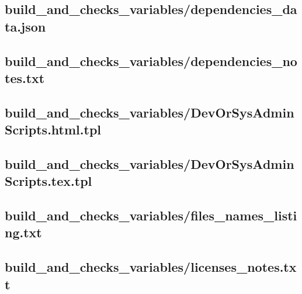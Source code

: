 \documentclass{article}
\begin{document}


\subsection{
  build\_and\_checks\_variables/dependencies\_data.json
}
\label{
  build_and_checks_variables:dependencies_datajson
}



\subsection{
  build\_and\_checks\_variables/dependencies\_notes.txt
}
\label{
  build_and_checks_variables:dependencies_notestxt
}



\subsection{
  build\_and\_checks\_variables/DevOrSysAdminScripts.html.tpl
}
\label{
  build_and_checks_variables:DevOrSysAdminScriptshtmltpl
}



\subsection{
  build\_and\_checks\_variables/DevOrSysAdminScripts.tex.tpl
}
\label{
  build_and_checks_variables:DevOrSysAdminScriptstextpl
}



\subsection{
  build\_and\_checks\_variables/files\_names\_listing.txt
}
\label{
  build_and_checks_variables:files_names_listingtxt
}



\subsection{
  build\_and\_checks\_variables/licenses\_notes.txt
}
\label{
  build_and_checks_variables:licenses_notestxt
}
\end{document}
